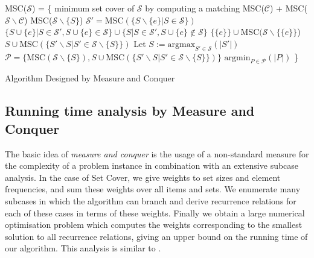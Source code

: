 \documentclass[fleqn]{stacs_proc}
\begin{document}
\begin{algorithm}
\begin{algorithmic}
\STATE MSC($\mathcal{S}$) = \{
	\RETURN minimum set cover of $\mathcal{S}$ by computing a matching
	\RETURN MSC($\mathcal{C}$) + MSC($\mathcal{S}\backslash\mathcal{C}$)
	\RETURN MSC($\mathcal{S}\backslash\{S\}$)
	\STATE $\mathcal{S'} = \mathrm{MSC}(\{S \backslash \{e\} | S \in \mathcal{S} \}) $
	\RETURN $\{S \cup \{e\} | S \in \mathcal{S'}, S \cup \{e\} \in \mathcal{S}\} \cup \{S | S \in \mathcal{S'}, S \cup \{e\} \not\in \mathcal{S} \}$
	\RETURN $\{\{ e \}\} \cup  \mathrm{MSC}(\mathcal{S} \backslash \{ \{e\} \}$)
	\RETURN $S \cup \mathrm{MSC}(\{S' \backslash S | S' \in \mathcal{S} \backslash \{ S \} \})$
\ELSE
	\STATE Let $S := \mathrm{argmax}_{S' \in \mathcal{S}}(|S'|)$
	\STATE $\mathcal{P} = \{ \mathrm{MSC}(\mathcal{S} \backslash \{ S \}), S \cup \mathrm{MSC}(\{S' \backslash S | S' \in \mathcal{S} \backslash \{ S \} \}) \}$
	\RETURN $\mathrm{argmin}_{P \in \mathcal{P}}(|P|)$
\ENDIF
\STATE \}
\end{algorithmic}
\caption{Algorithm Designed by Measure and Conquer}
\label{algorithm}
\end{algorithm}



\subsection{Running time analysis by Measure and Conquer} \label{sec:m&c}
The basic idea of {\em measure and conquer} is the usage of a non-standard measure 
for the complexity of a problem instance in combination with an extensive subcase analysis.
In the case of {\sc Set Cover}, we give weights to set sizes and element frequencies,
and sum these weights over all items and sets. We enumerate many subcases in which the algorithm
can branch and derive recurrence relations for each of these cases in terms of these weights.
Finally we obtain a large numerical optimisation problem which computes the weights corresponding
to the smallest solution to all recurrence relations, giving an upper bound on the running time of our algorithm.
This analysis is similar to \cite{FominGK05a}.
\end{document}
